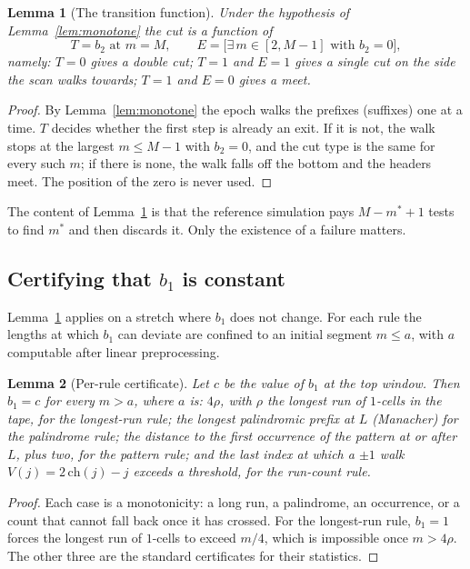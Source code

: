 \documentclass[11pt]{article}
\newtheorem{lemma}{Lemma}
\begin{document}
\begin{lemma}[The transition function]\label{lem:transition}
Under the hypothesis of Lemma~\ref{lem:monotone} the cut is a function of
\[
T=b_2\text{ at }m=M,\qquad E=\big[\exists\, m\in[2,M-1]\text{ with }b_2=0\big],
\]
namely: $T=0$ gives a double cut; $T=1$ and $E=1$ gives a single cut on the side the scan
walks towards; $T=1$ and $E=0$ gives a meet.
\end{lemma}

\begin{proof}
By Lemma~\ref{lem:monotone} the epoch walks the prefixes (suffixes) one at a time. $T$
decides whether the first step is already an exit. If it is not, the walk stops at the
largest $m\le M-1$ with $b_2=0$, and the cut type is the same for every such $m$; if there
is none, the walk falls off the bottom and the headers meet. The position of the zero is
never used.
\end{proof}

The content of Lemma~\ref{lem:transition} is that the reference simulation pays $M-m^*+1$
tests to find $m^*$ and then discards it. Only the existence of a failure matters.

\subsection{Certifying that $b_1$ is constant}

Lemma~\ref{lem:transition} applies on a stretch where $b_1$ does not change. For each rule
the lengths at which $b_1$ can deviate are confined to an initial segment $m\le a$, with
$a$ computable after linear preprocessing.

\begin{lemma}[Per-rule certificate]\label{lem:certificate}
Let $c$ be the value of $b_1$ at the top window. Then $b_1=c$ for every $m>a$, where $a$
is: $4\rho$, with $\rho$ the longest run of $1$-cells in the tape, for the longest-run
rule; the longest palindromic prefix at $L$ (Manacher) for the palindrome rule; the
distance to the first occurrence of the pattern at or after $L$, plus two, for the pattern
rule; and the last index at which a $\pm1$ walk $V(j)=2\,\mathrm{ch}(j)-j$ exceeds a
threshold, for the run-count rule.
\end{lemma}

\begin{proof}
Each case is a monotonicity: a long run, a palindrome, an occurrence, or a count that
cannot fall back once it has crossed. For the longest-run rule, $b_1=1$ forces the longest
run of $1$-cells to exceed $m/4$, which is impossible once $m>4\rho$. The other three are
the standard certificates for their statistics.
\end{proof}
\end{document}

